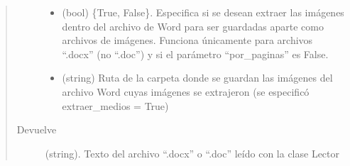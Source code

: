 \documentclass[letterpaper,10pt,openany,spanish]{sphinxmanual}
\begin{document}
\begin{fulllineitems}
\begin{fulllineitems}
\begin{quote}
\begin{description}
\begin{itemize}
\item {} 
 \textendash{} (bool) \{True, False\}. Especifica si se desean extraer las             imágenes dentro del archivo de Word para ser guardadas aparte como archivos             de imágenes. Funciona únicamente para archivos “.docx” (no “.doc”) y si el             parámetro “por\_paginas” es False.

\item {} 
 \textendash{} (string)\sphinxhyphen{} Ruta de la carpeta donde se guardan las imágenes del             archivo Word cuyas imágenes se extrajeron (se especificó             extraer\_medios = True)

\end{itemize}

\item[{Devuelve}] \leavevmode
(string). Texto del archivo “.docx” o “.doc” leído con la clase Lector

\end{description}\end{quote}

\end{fulllineitems}


\end{fulllineitems}

\end{document}
